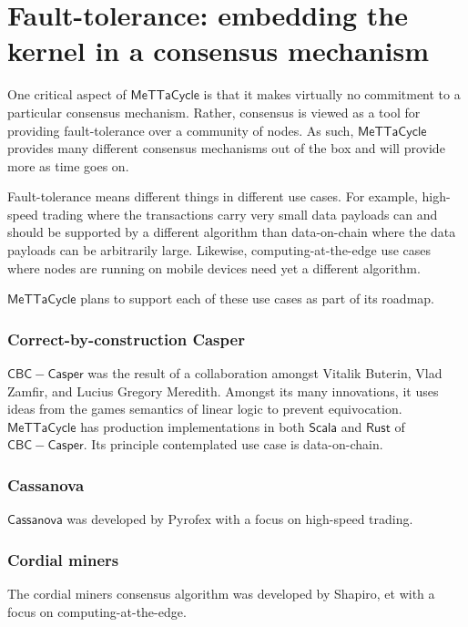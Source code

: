 \documentclass{article}
\newcommand{\MC}{\mathsf{MeTTaCycle}}
\begin{document}
\section{Fault-tolerance: embedding the kernel in a consensus mechanism}

One critical aspect of $\MC$ is that it makes virtually no commitment
to a particular consensus mechanism. Rather, consensus is viewed as a
tool for providing fault-tolerance over a community of nodes. As such,
$\MC$ provides many different consensus mechanisms out of the box and
will provide more as time goes on.

Fault-tolerance means different things in different use cases. For
example, high-speed trading where the transactions carry very small
data payloads can and should be supported by a different algorithm
than data-on-chain where the data payloads can be arbitrarily
large. Likewise, computing-at-the-edge use cases where nodes are
running on mobile devices need yet a different algorithm.

$\MC$ plans to support each of these use cases as part of its roadmap.

\subsubsection{Correct-by-construction Casper}

$\mathsf{CBC-Casper}$ was the result of a collaboration amongst
Vitalik Buterin, Vlad Zamfir, and Lucius Gregory Meredith. Amongst its
many innovations, it uses ideas from the games semantics of linear
logic to prevent equivocation. $\MC$ has production implementations in
both $\mathsf{Scala}$ and $\mathsf{Rust}$ of
$\mathsf{CBC-Casper}$. Its principle contemplated use case is
data-on-chain.

\subsubsection{Cassanova}

$\mathsf{Cassanova}$ was developed by Pyrofex with a focus on
high-speed trading.

\subsubsection{Cordial miners}

The cordial miners consensus algorithm was developed by Shapiro, et
with a focus on computing-at-the-edge.
\end{document}
